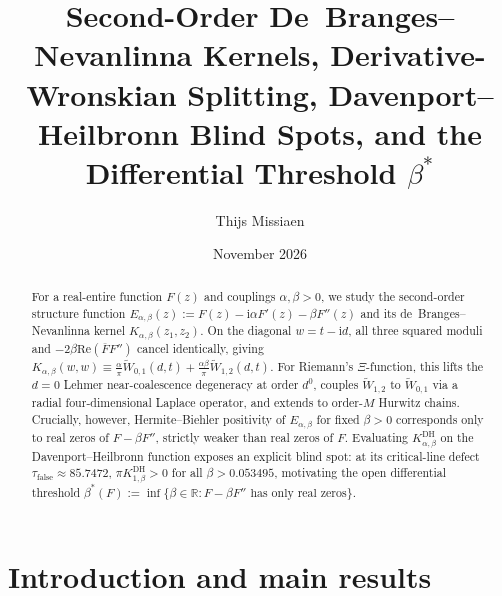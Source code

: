 \documentclass[11pt,reqno]{amsart}
\title[Second-Order De~Branges--Nevanlinna Kernels and Blind Spots]{Second-Order De~Branges--Nevanlinna Kernels, Derivative-Wronskian Splitting, Davenport--Heilbronn Blind Spots, and the Differential Threshold $\beta^*$}
\author{Thijs Missiaen}
\date{November 2026}
\theoremstyle{definition}
\theoremstyle{remark}
\numberwithin{equation}{section}
\newcommand{\R}{\mathbb{R}}
\newcommand{\ii}{\mathrm{i}}
\newcommand{\Rea}{\mathrm{Re}}
\begin{document}
\sloppy

\begin{abstract}
For a real-entire function $F(z)$ and couplings $\alpha, \beta > 0$, we study the second-order structure function $E_{\alpha,\beta}(z) := F(z) - \ii\alpha F'(z) - \beta F''(z)$ and its de~Branges--Nevanlinna kernel $K_{\alpha,\beta}(z_1, z_2)$. On the diagonal $w = t - \ii d$, all three squared moduli and $-2\beta\Rea(\overline{F}F'')$ cancel identically, giving $K_{\alpha,\beta}(w,w) \equiv \frac{\alpha}{\pi}\widetilde{W}_{0,1}(d,t) + \frac{\alpha\beta}{\pi}\widetilde{W}_{1,2}(d,t)$. For Riemann's $\Xi$-function, this lifts the $d=0$ Lehmer near-coalescence degeneracy at order $d^0$, couples $\widetilde{W}_{1,2}$ to $\widetilde{W}_{0,1}$ via a radial four-dimensional Laplace operator, and extends to order-$M$ Hurwitz chains. Crucially, however, Hermite--Biehler positivity of $E_{\alpha,\beta}$ for fixed $\beta > 0$ corresponds only to real zeros of $F - \beta F''$, strictly weaker than real zeros of $F$. Evaluating $K_{\alpha,\beta}^{\mathrm{DH}}$ on the Davenport--Heilbronn function exposes an explicit blind spot: at its critical-line defect $\tau_{\mathrm{false}} \approx 85.7472$, $\pi K_{1,\beta}^{\mathrm{DH}} > 0$ for all $\beta > 0.053495$, motivating the open differential threshold $\beta^*(F) := \inf\{\beta \in \R : F - \beta F'' \text{ has only real zeros}\}$.
\end{abstract}

\maketitle

\section{Introduction and main results}\label{sec:intro}
\end{document}
